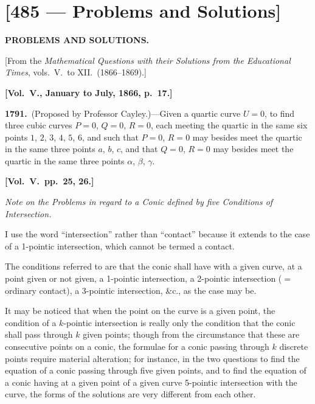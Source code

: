 \documentclass[11pt,a4paper]{article}
\theoremstyle{plain}
\theoremstyle{definition}
\theoremstyle{remark}
\begin{document}
\section*{[485 --- Problems and Solutions]}


\begin{center}
\textbf{PROBLEMS AND SOLUTIONS.}
\end{center}

[From the \textit{Mathematical Questions with their Solutions from the Educational Times}, vols.\ V.\ to XII.\ (1866--1869).]

\bigskip

\textbf{[Vol.\ V., January to July, 1866, p.\ 17.]}

\textbf{1791.}\ (Proposed by Professor Cayley.)---Given a quartic curve $U=0$, to find three cubic curves $P=0$, $Q=0$, $R=0$, each meeting the quartic in the same six points $1$, $2$, $3$, $4$, $5$, $6$, and such that $P=0$, $R=0$ may besides meet the quartic in the same three points $a$, $b$, $c$, and that $Q=0$, $R=0$ may besides meet the quartic in the same three points $\alpha$, $\beta$, $\gamma$.

\textbf{[Vol.\ V.\ pp.\ 25, 26.]}

\textit{Note on the Problems in regard to a Conic defined by five Conditions of Intersection.}

I use the word ``intersection'' rather than ``contact'' because it extends to the case of a 1-pointic intersection, which cannot be termed a contact.

The conditions referred to are that the conic shall have with a given curve, at a point given or not given, a 1-pointic intersection, a 2-pointic intersection ($=$ ordinary contact), a 3-pointic intersection, \&c., as the case may be.

It may be noticed that when the point on the curve is a given point, the condition of a $k$-pointic intersection is really only the condition that the conic shall pass through $k$ given points; though from the circumstance that these are consecutive points on a conic, the formulae for a conic passing through $k$ discrete points require material alteration; for instance, in the two questions to find the equation of a conic passing through five given points, and to find the equation of a conic having at a given point of a given curve 5-pointic intersection with the curve, the forms of the solutions are very different from each other.
\end{document}
